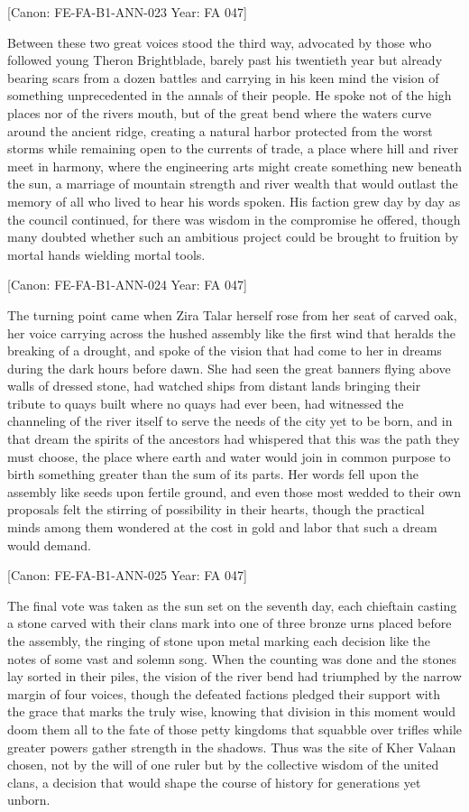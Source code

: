 {[}Canon: FE-FA-B1-ANN-023 \textbar{} Year: FA 047{]}

Between these two great voices stood the third way, advocated by those
who followed young Theron Brightblade, barely past his twentieth year
but already bearing scars from a dozen battles and carrying in his keen
mind the vision of something unprecedented in the annals of their
people. He spoke not of the high places nor of the
river\textquotesingle s mouth, but of the great bend where the waters
curve around the ancient ridge, creating a natural harbor protected from
the worst storms while remaining open to the currents of trade, a place
where hill and river meet in harmony, where the engineering arts might
create something new beneath the sun, a marriage of mountain strength
and river wealth that would outlast the memory of all who lived to hear
his words spoken. His faction grew day by day as the council continued,
for there was wisdom in the compromise he offered, though many doubted
whether such an ambitious project could be brought to fruition by mortal
hands wielding mortal tools.

{[}Canon: FE-FA-B1-ANN-024 \textbar{} Year: FA 047{]}

The turning point came when Zira Talar herself rose from her seat of
carved oak, her voice carrying across the hushed assembly like the first
wind that heralds the breaking of a drought, and spoke of the vision
that had come to her in dreams during the dark hours before dawn. She
had seen the great banners flying above walls of dressed stone, had
watched ships from distant lands bringing their tribute to quays built
where no quays had ever been, had witnessed the channeling of the river
itself to serve the needs of the city yet to be born, and in that dream
the spirits of the ancestors had whispered that this was the path they
must choose, the place where earth and water would join in common
purpose to birth something greater than the sum of its parts. Her words
fell upon the assembly like seeds upon fertile ground, and even those
most wedded to their own proposals felt the stirring of possibility in
their hearts, though the practical minds among them wondered at the cost
in gold and labor that such a dream would demand.

{[}Canon: FE-FA-B1-ANN-025 \textbar{} Year: FA 047{]}

The final vote was taken as the sun set on the seventh day, each
chieftain casting a stone carved with their clan\textquotesingle s mark
into one of three bronze urns placed before the assembly, the ringing of
stone upon metal marking each decision like the notes of some vast and
solemn song. When the counting was done and the stones lay sorted in
their piles, the vision of the river bend had triumphed by the narrow
margin of four voices, though the defeated factions pledged their
support with the grace that marks the truly wise, knowing that division
in this moment would doom them all to the fate of those petty kingdoms
that squabble over trifles while greater powers gather strength in the
shadows. Thus was the site of Kher Valaan chosen, not by the will of one
ruler but by the collective wisdom of the united clans, a decision that
would shape the course of history for generations yet unborn.

